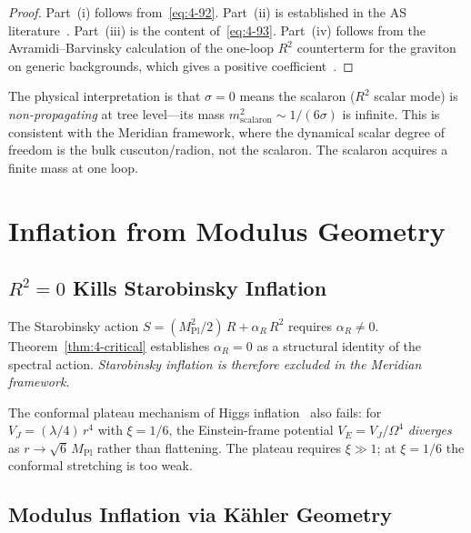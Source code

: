 \begin{proof}
Part~(i) follows from~\eqref{eq:4-92}. Part~(ii) is established in the AS literature~\cite{ch4:Benedetti2010,ch4:Codello2009}. Part~(iii) is the content of~\eqref{eq:4-93}. Part~(iv) follows from the Avramidi--Barvinsky calculation of the one-loop $R^2$ counterterm for the graviton on generic backgrounds, which gives a positive coefficient~\cite{ch4:AvramidiBarvinsky1985}.
\end{proof}

The physical interpretation is that $\sigma = 0$ means the scalaron ($R^2$ scalar mode) is \emph{non-propagating} at tree level---its mass $m_{\mathrm{scalaron}}^2 \sim 1/(6\sigma)$ is infinite. This is consistent with the Meridian framework, where the dynamical scalar degree of freedom is the bulk cuscuton/radion, not the scalaron. The scalaron acquires a finite mass at one loop.


\section{Inflation from Modulus Geometry}
\label{sec:4-inflation}

\subsection{$R^2 = 0$ Kills Starobinsky Inflation}
\label{sec:4-starobinsky-killed}

The Starobinsky action $S = (M_{\mathrm{Pl}}^2/2)\, R + \alpha_R\, R^2$ requires $\alpha_R \neq 0$. Theorem~\ref{thm:4-critical} establishes $\alpha_R = 0$ as a structural identity of the spectral action. \emph{Starobinsky inflation is therefore excluded in the Meridian framework.}

The conformal plateau mechanism of Higgs inflation~\cite{ch4:BezrukovShaposhnikov2008} also fails: for $V_J = (\lambda/4)\, r^4$ with $\xi = 1/6$, the Einstein-frame potential $V_E = V_J/\Omega^4$ \emph{diverges} as $r \to \sqrt{6}\, M_{\mathrm{Pl}}$ rather than flattening. The plateau requires $\xi \gg 1$; at $\xi = 1/6$ the conformal stretching is too weak.

\subsection{Modulus Inflation via K\"ahler Geometry}
\label{sec:4-modulus-inflation}

